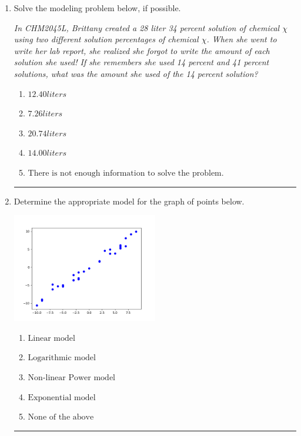 \documentclass[14pt]{extbook}
\newcommand{\litem}[1]{\item#1\hspace*{-1cm}\rule{\textwidth}{0.4pt}}
\begin{document}
\begin{enumerate}
{\begin{enumerate}[label=\Alph*.]
\end{enumerate} }
\litem{
Solve the modeling problem below, if possible.
\begin{center}
    \textit{ In CHM2045L, Brittany created a 28 liter 34 percent solution of chemical $\chi$ using two different solution percentages of chemical $\chi$. When she went to write her lab report, she realized she forgot to write the amount of each solution she used! If she remembers she used 14 percent and 41 percent solutions, what was the amount she used of the 14 percent solution? }
\end{center}
\begin{enumerate}[label=\Alph*.]
\item \( 12.40 liters \)
\item \( 7.26 liters \)
\item \( 20.74 liters \)
\item \( 14.00 liters \)
\item \( \text{There is not enough information to solve the problem.} \)

\end{enumerate} }
\litem{
Determine the appropriate model for the graph of points below.
\begin{center}
    \includegraphics[width=0.5\textwidth]{../Figures/identifyModelGraph12C.png}
\end{center}
\begin{enumerate}[label=\Alph*.]
\item \( \text{Linear model} \)
\item \( \text{Logarithmic model} \)
\item \( \text{Non-linear Power model} \)
\item \( \text{Exponential model} \)
\item \( \text{None of the above} \)


\end{enumerate}}
\end{enumerate}
\end{document}
